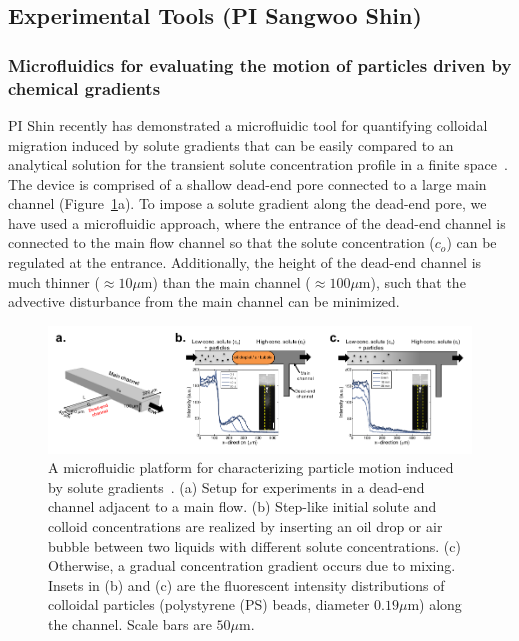 \documentclass[11pt]{article}
\begin{document}
\subsection{Experimental Tools (PI Sangwoo Shin)}
\label{subsection:exp_tools}
\subsubsection{Microfluidics for evaluating the motion of particles driven by chemical gradients\label{subsubsec:microfluidics}}
PI Shin recently has demonstrated a microfluidic tool for quantifying
colloidal migration induced by solute gradients that can be easily
compared to an analytical solution for the transient solute
concentration profile in a finite
space~\cite{shin2016,shin2017a,shin2017b}. The device is comprised of a
shallow dead-end pore connected to a large main channel
(Figure~\ref{fig:fig3}a).  To impose a solute gradient along the
dead-end pore, we have used a microfluidic approach, where the entrance
of the dead-end channel is connected to the main flow channel so that
the solute concentration ($c_o$) can be regulated at the entrance.
Additionally, the height of the dead-end channel is much thinner
($\approx 10 \mu$m) than the main channel ($\approx 100 \mu$m), such
that the advective disturbance from the main channel can be minimized.
%
\begin{figure}[h]
\begin{center}
\includegraphics*[keepaspectratio=true,scale=1]{figs/fig3.pdf}
\caption{\label{fig:fig3} A microfluidic platform for characterizing
  particle motion induced by solute gradients~\cite{shin2016,
  shin2017a}. (a) Setup for experiments in a dead-end channel adjacent
  to a main flow. (b) Step-like initial solute and colloid
  concentrations are realized by inserting an oil drop or air bubble
  between two liquids with different solute concentrations. (c)
  Otherwise, a gradual concentration gradient occurs due to mixing.
  Insets in (b) and (c) are the fluorescent intensity distributions of
  colloidal particles (polystyrene (PS) beads, diameter $0.19 \mu$m)
  along the channel. Scale bars are $50 \mu$m.}
\end{center}
\end{figure}
\end{document}

